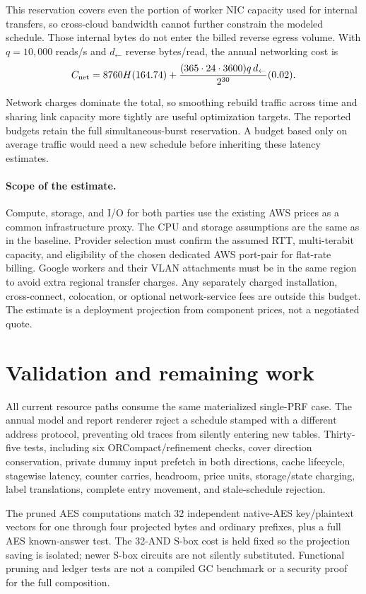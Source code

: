 \documentclass[11pt]{article}
\begin{document}
This reservation covers even the portion of worker NIC capacity used for
internal transfers, so cross-cloud bandwidth cannot further constrain the
modeled schedule. Those internal bytes do not enter the billed reverse
egress volume. With $q=10{,}000$ reads/s and $d_{\leftarrow}$ reverse
bytes/read, the annual networking cost is
\[
 C_{\rm net}=8760H(164.74)
 +\frac{(365\cdot24\cdot3600)q\,d_{\leftarrow}}{2^{30}}(0.02).
\]

Network charges dominate the total, so smoothing rebuild traffic across
time and sharing link capacity more tightly are useful optimization
targets. The reported budgets retain the full simultaneous-burst
reservation. A budget based only on average traffic would need a new
schedule before inheriting these latency estimates.

\paragraph{Scope of the estimate.}
Compute, storage, and I/O for both parties use the existing AWS prices as
a common infrastructure proxy. The CPU and storage assumptions are the
same as in the baseline. Provider selection must confirm the assumed RTT,
multi-terabit capacity, and eligibility of the chosen dedicated AWS
port-pair for flat-rate billing. Google workers and their VLAN attachments
must be in the same region to avoid extra regional transfer charges.
Any separately charged installation, cross-connect, colocation, or
optional network-service fees are outside this budget. The estimate is
a deployment projection from component prices, not a negotiated quote.

\clearpage
\section{Validation and remaining work}
All current resource paths consume the same materialized single-PRF case.
The annual model and report renderer reject a schedule stamped with a
different address protocol, preventing old traces from silently entering
new tables. Thirty-five tests, including six ORCompact/refinement checks,
cover direction conservation, private dummy
input prefetch in both directions, cache lifecycle, stagewise latency,
counter carries, headroom, price units, storage/state charging, label
translations, complete entry movement, and stale-schedule rejection.

The pruned AES computations match 32 independent native-AES key/plaintext
vectors for one through four projected bytes and ordinary prefixes, plus
a full AES known-answer test. The 32-AND S-box cost is held fixed so the
projection saving is isolated; newer S-box circuits are not silently
substituted. Functional pruning and ledger tests are not a compiled GC
benchmark or a security proof for the full composition.
\end{document}
